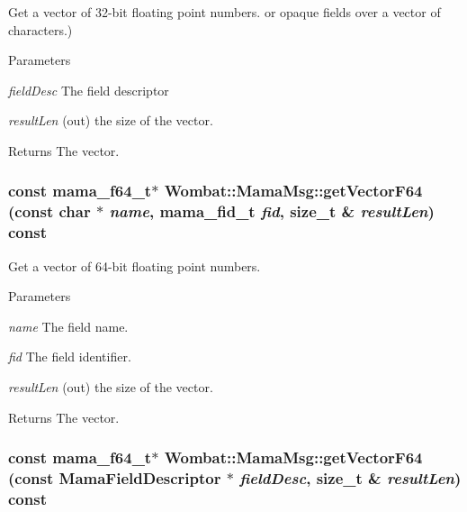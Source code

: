 Get a vector of 32-\/bit floating point numbers. or opaque fields over a vector of characters.) 
\begin{DoxyParams}{Parameters}
\item[{\em fieldDesc}]The field descriptor \item[{\em resultLen}](out) the size of the vector. \end{DoxyParams}
\begin{DoxyReturn}{Returns}
The vector. 
\end{DoxyReturn}
\hypertarget{classWombat_1_1MamaMsg_a28fa6171ad81113b231832a7858fc168}{
\subsubsection[{getVectorF64}]{\setlength{\rightskip}{0pt plus 5cm}const mama\_\-f64\_\-t$\ast$ Wombat::MamaMsg::getVectorF64 (const char $\ast$ {\em name}, \/  mama\_\-fid\_\-t {\em fid}, \/  size\_\-t \& {\em resultLen}) const}}
\label{classWombat_1_1MamaMsg_a28fa6171ad81113b231832a7858fc168}


Get a vector of 64-\/bit floating point numbers. 
\begin{DoxyParams}{Parameters}
\item[{\em name}]The field name. \item[{\em fid}]The field identifier. \item[{\em resultLen}](out) the size of the vector. \end{DoxyParams}
\begin{DoxyReturn}{Returns}
The vector. 
\end{DoxyReturn}
\hypertarget{classWombat_1_1MamaMsg_a5631c3dc1485076e1e1c45b08147fa6d}{
\subsubsection[{getVectorF64}]{\setlength{\rightskip}{0pt plus 5cm}const mama\_\-f64\_\-t$\ast$ Wombat::MamaMsg::getVectorF64 (const {\bf MamaFieldDescriptor} $\ast$ {\em fieldDesc}, \/  size\_\-t \& {\em resultLen}) const}}
\label{classWombat_1_1MamaMsg_a5631c3dc1485076e1e1c45b08147fa6d}


